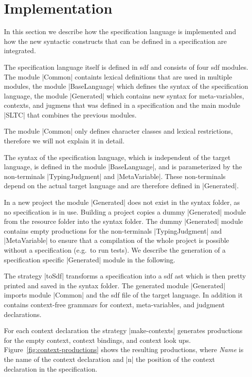 \section{Implementation}
\label{sec:generate-sdf}
In this section we describe how the specification language is
implemented and how the new syntactic constructs that can be defined
in a specification are integrated.

The specification language itself is defined in \gls{sdf} and consists
of four \gls{sdf} modules. The module \code|Common| containts lexical
definitions that are used in multiple modules, the module
\code|BaseLanguage| which defines the syntax of the specification
language, the module \code|Generated| which contains new syntax for
meta-variables, contexts, and jugmens that was defined in a
specification and the main module \code|SLTC| that combines the
previous modules.

The module \code|Common| only defines character classes and lexical
restrictions, therefore we will not explain it in detail.

The syntax of the specification language, which is independent of the
target language, is defined in the module \code|BaseLanguage|, and
is parameterized by the non-terminals \code|TypingJudgment| and
\code|MetaVariable|. These non-terminals depend on the actual target
language and are therefore defined in \code|Generated|.

In a new project the module \code|Generated| does not exist in the
syntax folder, as no specification is in use. Building a project
copies a dummy \code|Generated| module from the resource folder into
the syntax folder. The dummy \code|Generated| module contains empty
productions for the non-terminals \code|TypingJudgment| and
\code|MetaVariable| to ensure that a compilation of the whole project
is possible without a specification (e.g.\ to run tests). We describe
the generation of a specification specific \code|Generated| module in
the following.

The strategy \code|toSdf| transforms a specification into a \gls{sdf}
\gls{ast} which is then pretty printed and saved in the syntax
folder. The generated module \code|Generated| imports module
\code|Common| and the \gls{sdf} file of the target language. In
addition it contains context-free grammars for context,
meta-variables, and judgment declarations.

For each context declaration the strategy \code|make-contexts|
generates productions for the empty context, context bindings, and
context look ups. Figure~\ref{fig:context-productions} shows the
resulting productions, where \textit{Name} is the name of the context
declaration and \code|n| the position of the context declaration in
the specification.

